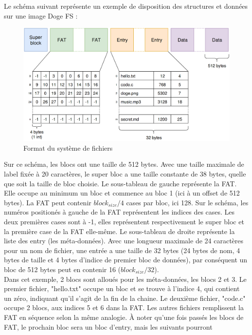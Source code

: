\documentclass[a4paper, 12pt]{article}
\begin{document}
Le schéma suivant représente un exemple de disposition des structures et données sur une image Doge FS :
\begin{figure}
	\begin{center}
		\includegraphics[width=1.0\textwidth]{schema.png}
		\caption{Format du système de fichiers}
	\end{center}
\end{figure}
Sur ce schéma, les blocs ont une taille de 512 bytes. Avec une taille maximale de label fixée à 20 caractères,
le super bloc a une taille constante de 38 bytes, quelle que soit la taille de bloc choisie. Le sous-tableau de
gauche représente la FAT. Elle occupe au minimum un bloc et commence au bloc 1 (ici à un offset de 512 bytes).
La FAT peut contenir $block_{size} / 4$ cases par bloc, ici 128. Sur le schéma, les numéros positionés à gauche de la
FAT représentent les indices des cases. Les deux premières cases sont à -1, elles représentent respectivement
le super bloc et la première case de la FAT elle-même.
Le sous-tableau de droite représente la liste des entry (les méta-données). Avec une longueur maximale de 24
caractères pour un nom de fichier, une entrée a une taille de 32 bytes (24 bytes de nom, 4 bytes de taille et
4 bytes d'indice de premier bloc de données), par conséquent un bloc de 512 bytes peut en contenir 16 
($block_{size} / 32$).
\\
Dans cet exemple, 2 blocs sont alloués pour les méta-données, les blocs 2 et 3. 
Le premier fichier, "hello.txt" occupe un bloc et se trouve à l'indice 4, qui contient un zéro, indiquant 
qu'il s'agit de la fin de la chaine. Le deuxième fichier, "code.c" occupe 2 blocs, aux indices 5 et 6 dans la FAT.
Les autres fichiers remplissent la FAT en séquence selon la même analogie.
À noter qu'une fois passés les blocs de FAT, le prochain bloc sera un bloc d'entry, mais les suivants pourront
\end{document}
